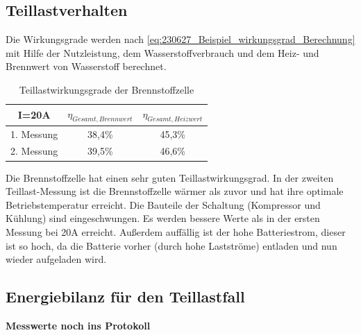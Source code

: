 \subsection{}




\subsection{Teillastverhalten}

Die Wirkungsgrade werden nach \autoref{eq:230627_Beispiel_wirkungsgrad_Berechnung} mit Hilfe der Nutzleistung, dem Wasserstoffverbrauch und dem Heiz- und Brennwert von Wasserstoff berechnet. 

\begin{table}[H]
    \caption{Teillastwirkungsgrade der Brennstoffzelle}
    \centering
        \begin{tabular}[pos]{|c|c|c|}
            \hline
            \rowcolor[HTML]{70AD47} 
            I=20A   & $\eta_{Gesamt,Brennwert}$               & $\eta_{Gesamt,Heizwert}$   \\\hline\hline
            1. Messung  & 38,4\%                            & 45,3\%                            \\ \hline
            2. Messung  & 39,5\%                            & 46,6\%                            \\\hline
        \end{tabular}
        \label{tab:20230628_Teillastwirkungsgrade}
\end{table}

Die Brennstoffzelle hat einen sehr guten Teillastwirkungsgrad. In der zweiten Teillast-Messung ist die Brennstoffzelle wärmer als zuvor und hat ihre optimale Betriebstemperatur erreicht. Die Bauteile der Schaltung (Kompressor und Kühlung) sind eingeschwungen. Es werden bessere Werte als in der ersten Messung bei 20A erreicht. Außerdem auffällig ist der hohe Batteriestrom, dieser ist so hoch, da die Batterie vorher (durch hohe Lastströme) entladen und nun wieder aufgeladen wird. 


\subsection{Energiebilanz für den Teillastfall}

\textbf{Messwerte noch ins Protokoll}